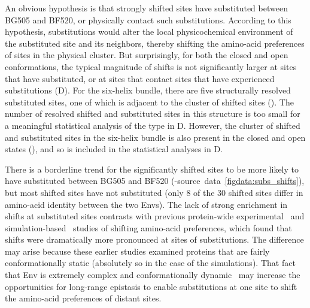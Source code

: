 \documentclass[9pt]{elife}
\begin{document}
An obvious hypothesis is that strongly shifted sites have substituted between BG505 and BF520, or physically contact such substitutions.
According to this hypothesis, substitutions would alter the local physicochemical environment of the substituted site and its neighbors, thereby shifting the amino-acid preferences of sites in the physical cluster.
But surprisingly, for both the closed and open conformations, the typical magnitude of shifts is not significantly larger at sites that have substituted, or at sites that contact sites that have experienced substitutions (D).
For the six-helix bundle, there are five structurally resolved substituted sites, one of which is adjacent to the cluster of shifted sites ().
The number of resolved shifted and substituted sites in this structure is too small for a meaningful statistical analysis of the type in D.
However, the cluster of shifted and substituted sites in the six-helix bundle is also present in the closed and open states (), and so is included in the statistical analyses in D.

There is a borderline trend for the significantly shifted sites to be more likely to have substituted between BG505 and BF520 (-source~data~\ref{figdata:subs_shifts}), but most shifted sites have not substituted (only 8 of the 30 shifted sites differ in amino-acid identity between the two Envs).
The lack of strong enrichment in shifts at substituted sites contrasts with previous protein-wide experimental~\citep{doud2015site} and simulation-based~\citep{pollock2012amino,shah2015contingency} studies of shifting amino-acid preferences, which found that shifts were dramatically more pronounced at sites of substitutions.
The difference may arise because these earlier studies examined proteins that are fairly conformationally static (absolutely so in the case of the simulations).
That fact that Env is extremely complex and conformationally dynamic~\citep{munro2014conformational,ozorowski2017open} may increase the opportunities for long-range epistasis to enable substitutions at one site to shift the amino-acid preferences of distant sites.
\end{document}
